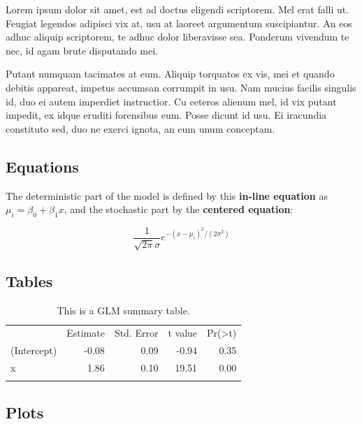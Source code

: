 \documentclass[]{article}
\begin{document}
Lorem ipsum dolor sit amet, est ad doctus eligendi scriptorem. Mel erat
falli ut. Feugiat legendos adipisci vix at, usu at laoreet argumentum
suscipiantur. An eos adhuc aliquip scriptorem, te adhuc dolor
liberavisse sea. Ponderum vivendum te nec, id agam brute disputando mei.

Putant numquam tacimates at eum. Aliquip torquatos ex vis, mei et quando
debitis appareat, impetus accumsan corrumpit in usu. Nam mucius facilis
singulis id, duo ei autem imperdiet instructior. Cu ceteros alienum mel,
id vix putant impedit, ex idque eruditi forensibus eum. Posse dicunt id
usu. Ei iracundia constituto sed, duo ne exerci ignota, an eum unum
conceptam.

\subsection{Equations}\label{equations}

The deterministic part of the model is defined by this \textbf{in-line
equation} as $\mu_i = \beta_0 + \beta_1x$, and the stochastic part by
the \textbf{centered equation}:

\[ \frac{1}{\sqrt{2\pi}\sigma}e^{-(x-\mu_i)^2/(2\sigma^2)} \]

\subsection{Tables}\label{tables}

\begin{longtable}[c]{@{}lrrrr@{}}
\toprule\addlinespace
& Estimate & Std. Error & t value &
Pr(\textgreater{}\textbar{}t\textbar{})
\\\addlinespace
\midrule\endhead
(Intercept) & -0.08 & 0.09 & -0.94 & 0.35
\\\addlinespace
x & 1.86 & 0.10 & 19.51 & 0.00
\\\addlinespace
\bottomrule
\addlinespace
\caption{This is a GLM summary table.}
\end{longtable}

\subsection{Plots}\label{plots}
\end{document}
